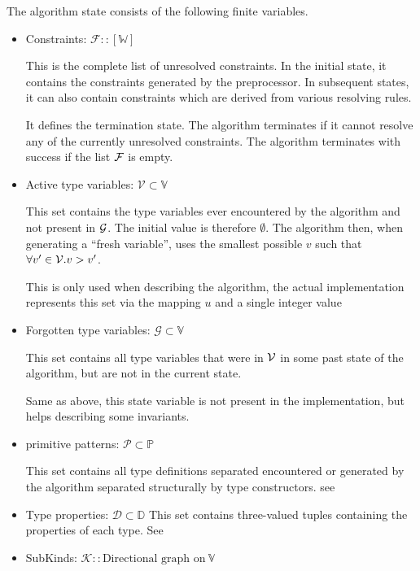 \begin{defn}
    The algorithm state consists of the following finite variables. 
    \begin{itemize}
        \item Constraints: $\mathcal{F} :: [\mathbb{W}]$

        This is the complete list of unresolved constraints. In the initial state, it contains the constraints generated by the preprocessor. In subsequent states, it can also contain constraints which are derived from various resolving rules.

        It defines the termination state. The algorithm terminates if it cannot resolve any of the currently unresolved constraints. The algorithm terminates with success if the list $\mathcal F$ is empty.
        \item Active type variables: $\mathcal{V} \subset \mathbb{V}$

        This set contains the type variables ever encountered by the algorithm and not present in $\mathcal G$. The initial value is therefore $\emptyset$. The algorithm then, when generating a ``fresh variable'', uses the smallest possible $v$ such that $\forall v' \in \mathcal V. v > v'$.

        This is only used when describing the algorithm, the actual implementation represents this set via the mapping $u$ and a single integer value

        \item Forgotten type variables: $\mathcal{G} \subset \mathbb{V}$

        This set contains all type variables that were in $\mathcal V$ in some past state of the algorithm, but are not in the current state.

        Same as above, this state variable is not present in the implementation, but helps describing some invariants.
        \item primitive patterns: $\mathcal{P} \subset \mathbb{P}$

        This set contains all type definitions separated encountered or generated by the algorithm separated structurally by type constructors. see 
        \item Type properties: $\mathcal{D} \subset \mathbb{D}$
        This set contains three-valued tuples containing the properties of each type. See 
        \item SubKinds: $\mathcal{K} :: \text{Directional graph on}\ \mathbb{V}$


\end{itemize}
\end{defn}
